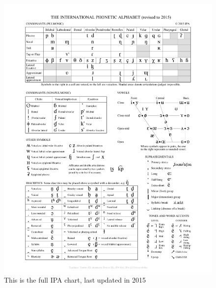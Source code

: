 \begin{figure}[h]
\vspace*{-1.5cm}
    \begin{center}
    \hspace*{-2cm}
      \includegraphics[width=1.3\linewidth]{ipa_chart.pdf}
    \end{center}
    \caption[Full IPA chart]{This is the full IPA chart, last updated in 2015}
    \label{fig:ipa_chart}
  \end{figure}


